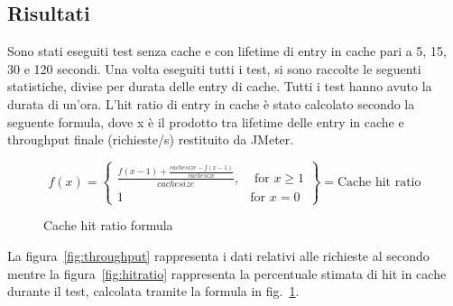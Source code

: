 \subsection{Risultati}
Sono stati eseguiti test senza cache e con lifetime di entry in cache pari a 5, 15, 30 e 120 secondi. 
Una volta eseguiti tutti i test, si sono raccolte le seguenti statistiche, divise per durata delle entry di cache. Tutti i test hanno avuto la durata di un'ora.
L'hit ratio di entry in cache è stato calcolato secondo la seguente formula, dove x è il prodotto tra lifetime delle entry in cache e throughput finale (richieste/s) restituito da JMeter.
\begin{figure}[h!]

\begin{Large}




  \[
    f(x) = \left\{\begin{array}{lr}
        \frac{f(x-1)+\frac{cachesize - f(x-1)}{cachesize}}{cachesize}, & \text{ for } x\geq 1\\
        1 & \text{for } x=0
        \end{array}\right\} = \text{Cache hit ratio}
  \]
\caption{Cache hit ratio formula}
\label{fig:formula}
\end{Large}

\end{figure}
\FloatBarrier
La figura~\ref{fig:throughput} rappresenta i dati relativi alle richieste al secondo mentre la figura~\ref{fig:hitratio} rappresenta la percentuale stimata di hit in cache durante il test, calcolata tramite la formula in fig.~\ref{fig:formula}.
